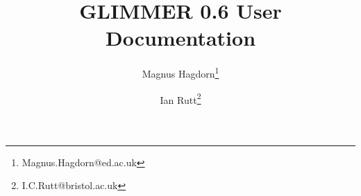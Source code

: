 \newcommand{\dir}{ug}

\pagestyle{myheadings}


\title{GLIMMER 0.6 User Documentation}
\author{Magnus Hagdorn\thanks{Magnus.Hagdorn@ed.ac.uk} \and Ian Rutt\thanks{I.C.Rutt@bristol.ac.uk}}
\maketitle
\tableofcontents
\newpage


